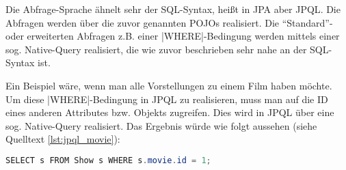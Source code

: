 Die Abfrage-Sprache ähnelt sehr der \acs{SQL}-Syntax, heißt in \ac{JPA} aber \acf{JPQL}.
Die Abfragen werden über die zuvor genannten \acsp{POJO} realisiert.
Die \enquote{Standard}- oder erweiterten Abfragen z.B. einer \sinline|WHERE|-Bedingung werden mittels einer sog. Native-Query realisiert, die wie zuvor beschrieben sehr nahe an der \acs{SQL}-Syntax ist.

Ein Beispiel wäre, wenn man alle Vorstellungen zu einem Film haben möchte.
Um diese \sinline|WHERE|-Bedingung in \acs{JPQL} zu realisieren, muss man auf die ID eines anderen Attributes bzw. Objekts zugreifen.
Dies wird in \acs{JPQL} über eine sog. Native-Query realisiert.
Das Ergebnis würde wie folgt aussehen (siehe Quelltext \vref{lst:jpql_movie}): 

\begin{lstlisting}[language=JAVA]
SELECT s FROM Show s WHERE s.movie.id = 1; 
\end{lstlisting}
\label{lst:jpql_movie}